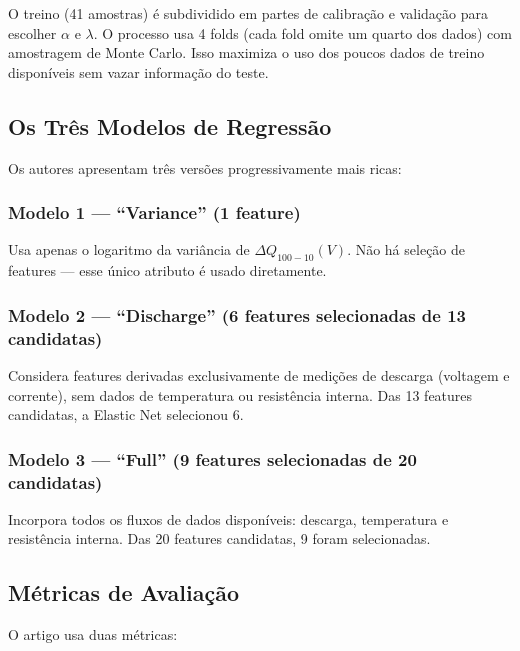 \documentclass[12pt,a4paper]{article}
\begin{document}
\begin{conceito}
O treino (41 amostras) \'{e} subdividido em partes de calibra\c{c}\~ao e valida\c{c}\~ao
para escolher $\alpha$ e $\lambda$. O processo usa 4 folds (cada fold omite
um quarto dos dados) com amostragem de Monte Carlo. Isso maximiza o uso dos
poucos dados de treino dispon\'{i}veis sem vazar informa\c{c}\~ao do teste.
\end{conceito}

\subsection{Os Tr\^{e}s Modelos de Regress\~ao}

Os autores apresentam tr\^{e}s vers\~oes progressivamente mais ricas:

\subsubsection{Modelo 1 --- ``Variance'' (1 feature)}

Usa apenas o logaritmo da vari\^{a}ncia de $\Delta Q_{100-10}(V)$. N\~ao h\'{a}
sele\c{c}\~ao de features --- esse \'{u}nico atributo \'{e} usado diretamente.

\subsubsection{Modelo 2 --- ``Discharge'' (6 features selecionadas de 13 candidatas)}

Considera features derivadas exclusivamente de medi\c{c}\~oes de descarga
(voltagem e corrente), sem dados de temperatura ou resist\^{e}ncia interna.
Das 13 features candidatas, a Elastic Net selecionou 6.

\subsubsection{Modelo 3 --- ``Full'' (9 features selecionadas de 20 candidatas)}

Incorpora todos os fluxos de dados dispon\'{i}veis: descarga, temperatura e
resist\^{e}ncia interna. Das 20 features candidatas, 9 foram selecionadas.

\subsection{M\'{e}tricas de Avalia\c{c}\~ao}

O artigo usa duas m\'{e}tricas:
\end{document}

